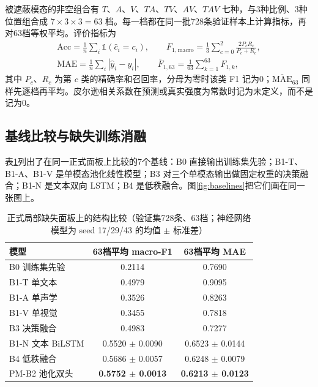 被遮蔽模态的非空组合有 $T$、$A$、$V$、$TA$、$TV$、$AV$、$TAV$ 七种，与3种比例、3种位置组合成 $7\times3\times3=63$ 档。每一档都在同一批728条验证样本上计算指标，再对63档等权平均。评价指标为
\begin{equation}\label{eq:metrics}
\begin{gathered}
\mathrm{Acc}=\frac{1}{n}\sum_i\mathbb{1}(\hat c_i=c_i),\qquad
F_{1,\mathrm{macro}}=\frac{1}{3}\sum_{c=0}^{2}\frac{2P_cR_c}{P_c+R_c},\\
\mathrm{MAE}=\frac{1}{n}\sum_i|\hat y_i-y_i|,\qquad
\bar F_{1,63}=\frac{1}{63}\sum_{k=1}^{63}F_{1,k},
\end{gathered}
\end{equation}
其中 $P_c$、$R_c$ 为第 $c$ 类的精确率和召回率，分母为零时该类 F1 记为0；$\overline{\mathrm{MAE}}_{63}$ 同样先逐档再平均。皮尔逊相关系数在预测或真实强度为常数时记为未定义，而不是记为0。

\subsection{基线比较与缺失训练消融}\label{sec:baseline}

表\ref{tab:baselines}列出了在同一正式面板上比较的7个基线：B0 直接输出训练集先验；B1-T、B1-A、B1-V 是单模态池化线性模型；B3 对三个单模态输出做固定权重的决策融合；B1-N 是文本双向 LSTM；B4 是低秩融合\cite{liu2018lmf}。图\ref{fig:baselines}把它们画在同一张图上。

\begin{table}[htbp]
\centering
\caption{正式局部缺失面板上的结构比较（验证集728条、63档；神经网络模型为 seed 17/29/43 的均值 $\pm$ 标准差）}
\label{tab:baselines}
\begin{tabular}{lcc}
\toprule
模型 & 63档平均 macro-F1 & 63档平均 MAE \\
\midrule
B0 训练集先验 & 0.2114 & 0.7690 \\
B1-T 单文本 & 0.4979 & 0.9095 \\
B1-A 单声学 & 0.3526 & 0.8263 \\
B1-V 单视觉 & 0.3455 & 0.7818 \\
B3 决策融合 & 0.4983 & 0.7277 \\
B1-N 文本 BiLSTM & 0.5520 $\pm$ 0.0090 & 0.6523 $\pm$ 0.0144 \\
B4 低秩融合 & 0.5686 $\pm$ 0.0057 & 0.6248 $\pm$ 0.0079 \\
PM-B2 池化双头 & \textbf{0.5752 $\pm$ 0.0013} & \textbf{0.6213 $\pm$ 0.0123} \\
\bottomrule
\end{tabular}
\end{table}

